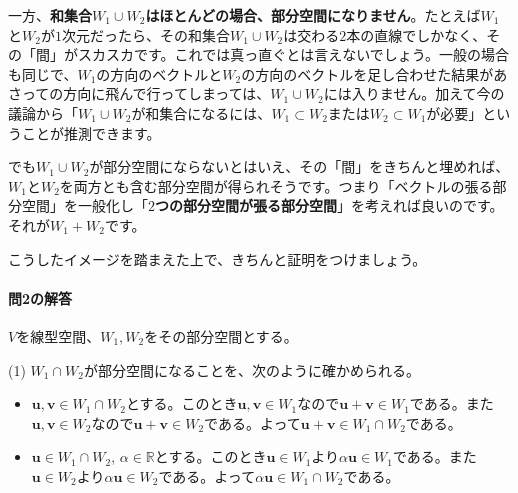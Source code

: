 一方、\textbf{和集合$W_1\cup W_2$はほとんどの場合、部分空間になりません}。たとえば$W_1$と$W_2$が$1$次元だったら、その和集合$W_1\cup W_2$は交わる$2$本の直線でしかなく、その「間」がスカスカです。これでは真っ直ぐとは言えないでしょう。一般の場合も同じで、$W_1$の方向のベクトルと$W_2$の方向のベクトルを足し合わせた結果があさっての方向に飛んで行ってしまっては、$W_1\cup W_2$には入りません。加えて今の議論から「$W_1\cup W_2$が和集合になるには、$W_1\subset W_2$または$W_2\subset W_1$が必要」ということが推測できます。

\begin{figure}[h!tbp]
\centering
{} \qquad \qquad
{}
\end{figure}

でも$W_1\cup W_2$が部分空間にならないとはいえ、その「間」をきちんと埋めれば、$W_1$と$W_2$を両方とも含む部分空間が得られそうです。つまり「ベクトルの張る部分空間」を一般化し「\textbf{$2$つの部分空間が張る部分空間}」を考えれば良いのです。それが$W_1 + W_2$です。

こうしたイメージを踏まえた上で、きちんと証明をつけましょう。

\paragraph{問2の解答} $V$を線型空間、$W_1, W_2$をその部分空間とする。

\noindent (1) $W_1\cap W_2$が部分空間になることを、次のように確かめられる。
\begin{itemize}
\item $\bm{u}, \bm{v} \in W_1 \cap W_2$とする。このとき$\bm{u}, \bm{v}\in W_1$なので$\bm{u} + \bm{v} \in W_1$である。また$\bm{u}, \bm{v} \in W_2$なので$\bm{u} + \bm{v} \in W_2$である。よって$\bm{u} + \bm{v} \in W_1 \cap W_2$である。
\item $\bm{u}\in W_1\cap W_2$, $\alpha\in\mathbb{R}$とする。このとき$\bm{u}\in W_1$より$\alpha\bm{u} \in W_1$である。また$\bm{u}\in W_2$より$\alpha\bm{u} \in W_2$である。よって$\alpha \bm{u}\in W_1\cap W_2$である。
\end{itemize}

